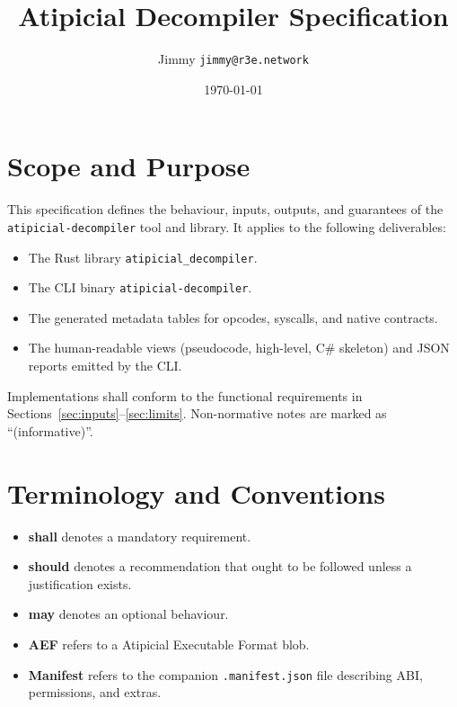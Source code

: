 \documentclass[11pt]{article}
\title{Atipicial Decompiler Specification}
\author{Jimmy \texttt{jimmy@r3e.network}}
\date{\today}
\begin{document}
\maketitle

\section{Scope and Purpose}
This specification defines the behaviour, inputs, outputs, and guarantees of the
\texttt{atipicial-decompiler} tool and library. It applies to the following deliverables:
\begin{itemize}[nosep]
    \item The Rust library \texttt{atipicial\_decompiler}.
    \item The CLI binary \texttt{atipicial-decompiler}.
    \item The generated metadata tables for opcodes, syscalls, and native contracts.
    \item The human-readable views (pseudocode, high-level, C\# skeleton) and
    JSON reports emitted by the CLI.
\end{itemize}

Implementations shall conform to the functional requirements in
Sections~\ref{sec:inputs}--\ref{sec:limits}. Non-normative notes are marked as
``(informative)''.

\section{Terminology and Conventions}
\begin{itemize}[nosep]
    \item \textbf{shall} denotes a mandatory requirement.
    \item \textbf{should} denotes a recommendation that ought to be followed
    unless a justification exists.
    \item \textbf{may} denotes an optional behaviour.
    \item \textbf{AEF} refers to a Atipicial  Executable Format blob.
    \item \textbf{Manifest} refers to the companion \texttt{.manifest.json}
    file describing ABI, permissions, and extras.
\end{itemize}
\end{document}
